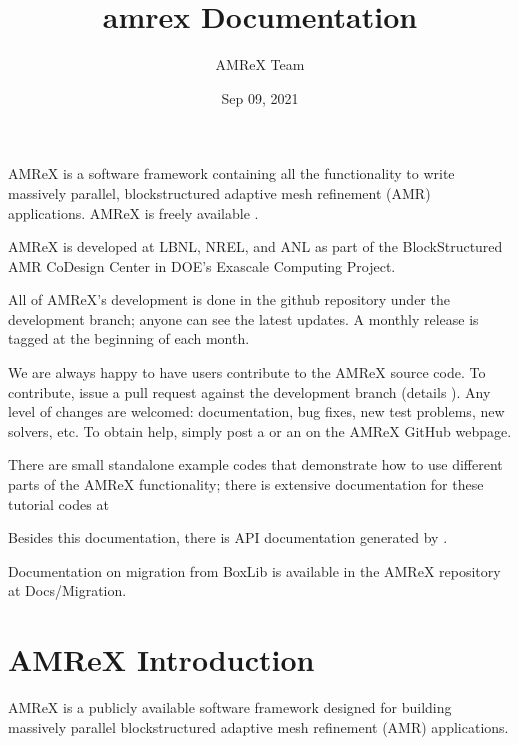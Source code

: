 \documentclass[letterpaper,10pt,english]{sphinxmanual}
\title{amrex Documentation}
\date{Sep 09, 2021}
\author{AMReX Team}
\begin{document}
\pagestyle{empty}
\sphinxmaketitle
\pagestyle{plain}
\sphinxtableofcontents
\pagestyle{normal}
\label{\detokenize{index::doc}}


\sphinxAtStartPar
AMReX is a software framework containing all the functionality to write
massively parallel, block\sphinxhyphen{}structured adaptive mesh refinement (AMR)
applications. AMReX is freely available .

\sphinxAtStartPar
AMReX is developed at LBNL, NREL, and ANL as part of the Block\sphinxhyphen{}Structured AMR
Co\sphinxhyphen{}Design Center in DOE’s Exascale Computing Project.

\sphinxAtStartPar
All of AMReX’s development is done in the github repository under the
development branch; anyone can see the latest updates. A monthly release is tagged at the beginning
of each month.

\sphinxAtStartPar
We are always happy to have users contribute to the AMReX source code. To
contribute, issue a pull request against the development branch (details ).  Any level of
changes are welcomed: documentation, bug fixes, new test problems, new solvers,
etc.  To obtain help, simply post a
or an 
on the AMReX GitHub webpage.

\sphinxAtStartPar
There are small stand\sphinxhyphen{}alone example codes that demonstrate how to use different parts of the AMReX functionality;
there is extensive documentation for these tutorial codes at 

\sphinxAtStartPar
Besides this documentation, there is API documentation generated by .

\sphinxAtStartPar
Documentation on migration from BoxLib is available in the AMReX repository at Docs/Migration.


\chapter{AMReX Introduction}
\label{\detokenize{Introduction:amrex-introduction}}\label{\detokenize{Introduction::doc}}
\sphinxAtStartPar
AMReX is a publicly available software framework designed for building
massively parallel block\sphinxhyphen{}structured adaptive mesh refinement (AMR)
applications.
\end{document}
